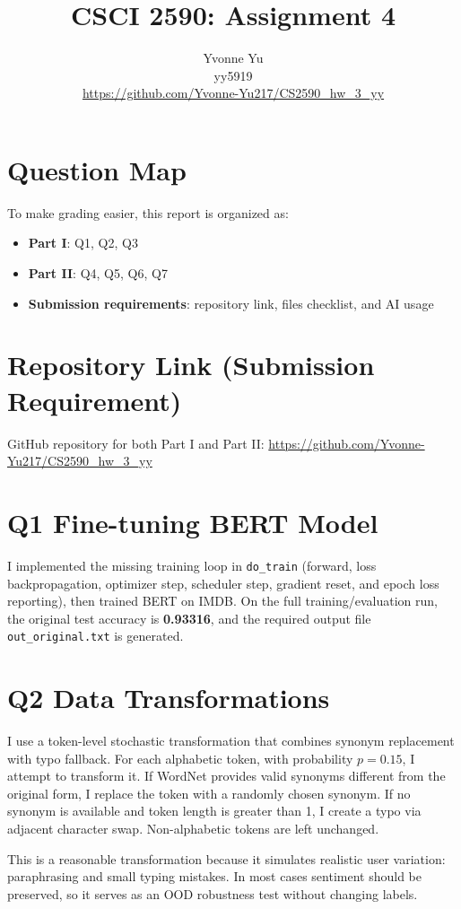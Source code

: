 \documentclass{article}
\title{CSCI 2590: Assignment 4}
\author{Yvonne Yu \\ yy5919 \\ \href{https://github.com/Yvonne-Yu217/CS2590_hw_3_yy}{https://github.com/Yvonne-Yu217/CS2590\_hw\_3\_yy}}
\date{}
\begin{document}
\maketitle

\section*{Question Map}
To make grading easier, this report is organized as:
\begin{itemize}
  \item \textbf{Part I}: Q1, Q2, Q3
  \item \textbf{Part II}: Q4, Q5, Q6, Q7
  \item \textbf{Submission requirements}: repository link, files checklist, and AI usage
\end{itemize}

\section*{Repository Link (Submission Requirement)}
GitHub repository for both Part I and Part II:
\href{https://github.com/Yvonne-Yu217/CS2590_hw_3_yy}{https://github.com/Yvonne-Yu217/CS2590\_hw\_3\_yy}

\section*{Q1 Fine-tuning BERT Model}
I implemented the missing training loop in \texttt{do\_train} (forward, loss backpropagation,
optimizer step, scheduler step, gradient reset, and epoch loss reporting), then trained BERT on IMDB.
On the full training/evaluation run, the original test accuracy is \textbf{0.93316}, and the required
output file \texttt{out\_original.txt} is generated.

\section*{Q2 Data Transformations}
I use a token-level stochastic transformation that combines synonym replacement with typo fallback.
For each alphabetic token, with probability $p=0.15$, I attempt to transform it. If WordNet provides
valid synonyms different from the original form, I replace the token with a randomly chosen synonym.
If no synonym is available and token length is greater than 1, I create a typo via adjacent character swap.
Non-alphabetic tokens are left unchanged.

This is a reasonable transformation because it simulates realistic user variation: paraphrasing and
small typing mistakes. In most cases sentiment should be preserved, so it serves as an OOD robustness test
without changing labels.
\end{document}
